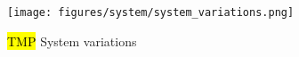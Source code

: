 



\begin{figure}[H]
  \centering
  \texttt{[image: figures/system/system\_variations.png]}
  \caption{\hl{TMP} System variations}
  \label{fig:system_variations}
\end{figure}



